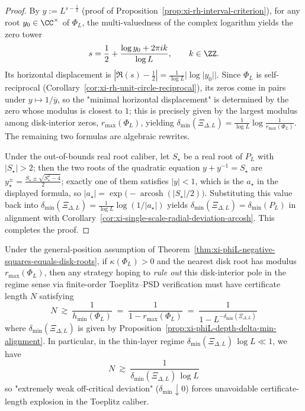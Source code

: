 \begin{proof}
By \(y:=L^{s-\frac12}\) (proof of Proposition~\ref{prop:xi-rh-interval-criterion}), for any root \(y_0\in\CC^\times\) of \(\Phi_L\), the multi-valuedness of the complex logarithm yields the zero tower
\[
s=\frac12+\frac{\log y_0+2\pi i k}{\log L},\qquad k\in\ZZ.
\]
Its horizontal displacement is \(|\Re(s)-\tfrac12|=\frac{1}{\log L}|\log|y_0||\).
Since \(\Phi_L\) is self-reciprocal (Corollary~\ref{cor:xi-rh-unit-circle-reciprocal}), its zeros come in pairs under \(y\mapsto 1/\overline y\), so the "minimal horizontal displacement" is determined by the zero whose modulus is closest to \(1\); this is precisely given by the largest modulus among disk-interior zeros, \(r_{\max}(\Phi_L)\), yielding
\(\delta_{\min}(\Xi_{\Delta,L})=\frac{1}{\log L}\log\frac{1}{r_{\max}(\Phi_L)}\).
The remaining two formulas are algebraic rewrites.
\par
Under the out-of-bounds real root caliber, let \(S_\star\) be a real root of \(P_L\) with \(|S_\star|>2\); then the two roots of the quadratic equation \(y+y^{-1}=S_\star\) are
\(
y_\star^{\pm}=\frac{S_\star\pm\sqrt{S_\star^2-4}}{2}
\);
exactly one of them satisfies \(|y|<1\), which is the \(a_\star\) in the displayed formula, so \(|a_\star|=\exp\!\bigl(-\operatorname{arcosh}(|S_\star|/2)\bigr)\).
Substituting this value back into \(\delta_{\min}(\Xi_{\Delta,L})=\frac{1}{\log L}\log(1/|a_\star|)\) yields \(\delta_{\min}(\Xi_{\Delta,L})=\delta_{\min}(P_L)\) in alignment with Corollary~\ref{cor:xi-single-scale-radial-deviation-arcosh}. This completes the proof.
\end{proof}

\begin{corollary}\label{cor:xi-phiL-toeplitz-length-lb-delta-min}
Under the general-position assumption of Theorem~\ref{thm:xi-phiL-negative-squares-equals-disk-roots}, if \(\kappa(\Phi_L)>0\) and the nearest disk root has modulus \(r_{\max}(\Phi_L)\), then any strategy hoping to \emph{rule out} this disk-interior pole in the regime sense via finite-order Toeplitz--PSD verification must have certificate length \(N\) satisfying
\[
\boxed{\;
N\ \gtrsim\ \frac{1}{h_{\min}(\Phi_L)}
\;=\;\frac{1}{1-r_{\max}(\Phi_L)}
\;=\;\frac{1}{1-L^{-\delta_{\min}(\Xi_{\Delta,L})}}\;}
\]
where \(\delta_{\min}(\Xi_{\Delta,L})\) is given by Proposition~\ref{prop:xi-phiL-depth-delta-min-alignment}.
In particular, in the thin-layer regime \(\delta_{\min}(\Xi_{\Delta,L})\,\log L\ll 1\), we have
\[
\boxed{\;
N\ \gtrsim\ \frac{1}{\delta_{\min}(\Xi_{\Delta,L})\,\log L}\;}
\]
so "extremely weak off-critical deviation" (\(\delta_{\min}\downarrow 0\)) forces unavoidable certificate-length explosion in the Toeplitz caliber.
\end{corollary}

